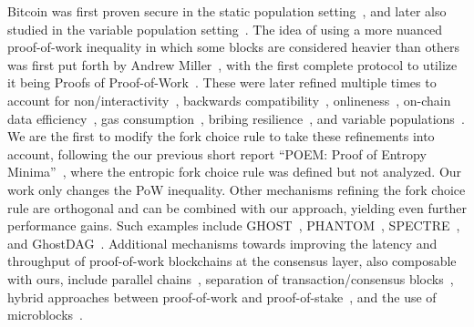 \noindent
{}
Bitcoin was first proven secure in the static population setting~\cite{backbone},
and later also studied in the variable population setting~\cite{varbackbone}.
The idea of using a more nuanced proof-of-work inequality in which some blocks
are considered heavier than others was first put forth by Andrew Miller~\cite{highway},
with the first complete protocol to utilize it being
Proofs of Proof-of-Work~\cite{popow}. These were later refined multiple times
to account for non\-/interactivity~\cite{nipopows}, backwards compatibility~\cite{velvet-nipopows},
onlineness~\cite{logspace}, on-chain data efficiency~\cite{compact-superblocks},
gas consumption~\cite{gasefficient-nipopows},
bribing resilience~\cite{soft-power},
and variable populations~\cite{dionyziz}.
We are the first to modify the fork choice rule to take these refinements into
account, following \ifanonymous
the
\else
our
\fi
previous short report ``POEM: Proof of Entropy Minima''~\cite{poem-short},
where the entropic fork choice rule was defined but not analyzed.
Our work only changes the PoW inequality.
Other mechanisms refining the fork choice rule
are orthogonal and can be combined with our approach, yielding even
further performance gains.
Such examples include GHOST~\cite{ghost},
PHANTOM~\cite{phantom}, SPECTRE~\cite{spectre}, and GhostDAG~\cite{ghostdag}.
Additional mechanisms towards improving the latency and throughput
of proof-of-work blockchains at the consensus
layer, also composable with ours, include parallel chains~\cite{parallel-chains},
separation of transaction/consensus blocks~\cite{prism},
hybrid approaches between proof-of-work and proof-of-stake~\cite{byzcoin},
and the use of microblocks~\cite{bitcoin-ng}.